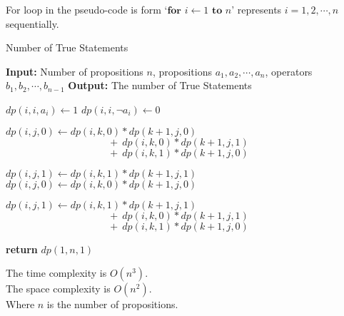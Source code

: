 For loop in the pseudo-code is form `$\textbf{for } i \gets 1 \textbf{ to } n$' represents $i=1,2,\cdots,n$ sequentially.
\begin{algorithm}
    \caption{Number of True Statements}\label{alg:problem-5}
    \begin{algorithmic}[1]
    \State \textbf{Input:} Number of propositions $n$, propositions $a_1,a_2,\cdots,a_n$, operators $b_1,b_2,\cdots,b_{n-1}$
    \State \textbf{Output:} The number of True Statements

        \State $dp(i,i,a_i) \gets 1$
        \State $dp(i,i,\neg a_i) \gets 0$
    \EndFor
    
                    \State $dp(i,j,0) \gets dp(i,k,0) * dp(k+1,j,0)$
                    \Statex $\quad\quad\quad\quad\quad\quad\quad\quad\quad\quad\  +\ dp(i,k,0) * dp(k+1,j,1)$
                    \Statex $\quad\quad\quad\quad\quad\quad\quad\quad\quad\quad\  +\ dp(i,k,1) * dp(k+1,j,0)$
                    
                    \State $dp(i,j,1) \gets dp(i,k,1)*dp(k+1,j,1)$
                \Else
                    \State $dp(i,j,0) \gets dp(i,k,0) * dp(k+1,j,0)$
                    
                    \State $dp(i,j,1) \gets dp(i,k,1)*dp(k+1,j,1)$
                    \Statex $\quad\quad\quad\quad\quad\quad\quad\quad\quad\quad\  +\ dp(i,k,0) * dp(k+1,j,1)$
                    \Statex $\quad\quad\quad\quad\quad\quad\quad\quad\quad\quad\  +\ dp(i,k,1) * dp(k+1,j,0)$
                    
                    \EndIf
            \EndFor
        \EndFor
    \EndFor


    \State \textbf{return} $dp(1,n,1)$
    \end{algorithmic}
\end{algorithm}

The time complexity is $O(n^3)$.\\
The space complexity is $O(n^2)$.\\
Where $n$ is the number of propositions.\\

\newpage